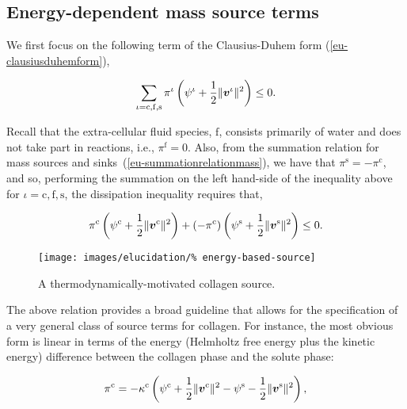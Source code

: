 \subsection{Energy-dependent mass source terms}
\label{eu-energy-dependent-source}

We first focus on the following term of the Clausius-Duhem form
(\ref{eu-clausiusduhemform}),

\begin{equation*}
\sum\limits_{\iota=\mathrm{c},\mathrm{f},\mathrm{s}} 
 \pi^{\iota} \left(\psi^{\iota}+\frac{1}{2}
\Vert\mbox{\boldmath$ v$}^\iota\Vert^2\right) \leq 0.
\end{equation*}

Recall that the extra-cellular fluid species, $\mathrm{f}$, consists
primarily of water and does not take part in reactions, i.e.,
$\pi^\mathrm{f} = 0$. Also, from the summation relation for mass
sources and sinks~(\ref{eu-summationrelationmass}), we have that
$\pi^\mathrm{s} = - \pi^\mathrm{c}$, and so, performing the summation
on the left hand-side of the inequality above for
$\iota=\mathrm{c,f,s}$, the dissipation inequality requires that,

\begin{equation*}
 \pi^{\mathrm{c}} \left(\psi^{\mathrm{c}}+\frac{1}{2}
\Vert\mbox{\boldmath$ v$}^{\mathrm{c}}\Vert^2\right)
+ \left(-\pi^{\mathrm{c}}\right) \left(\psi^{\mathrm{s}}+\frac{1}{2}
\Vert\mbox{\boldmath$ v$}^{\mathrm{s}}\Vert^2\right) \leq 0.
\end{equation*}

\begin{figure}
  \centering
  \texttt{[image: images/elucidation/\%
    energy-based-source]}
  \caption{A thermodynamically-motivated collagen source.}
  \label{energy-based-source}
\end{figure}

\noindent The above relation provides a broad guideline that allows
for the specification of a very general class of source terms for
collagen. For instance, the most obvious form is linear in terms of
the energy (Helmholtz free energy plus the kinetic energy) difference
between the collagen phase and the solute phase:

\begin{equation}
 \pi^{\mathrm{c}} = -\kappa^{\mathrm{c}}
 \left(\psi^{\mathrm{c}}+\frac{1}{2} \Vert\mbox{\boldmath$ v$}^{\mathrm{c}}\Vert^2 -
 \psi^{\mathrm{s}}-\frac{1}{2} \Vert\mbox{\boldmath$ v$}^{\mathrm{s}}\Vert^2\right),
\label{eu-energy-source-linear}
\end{equation}

